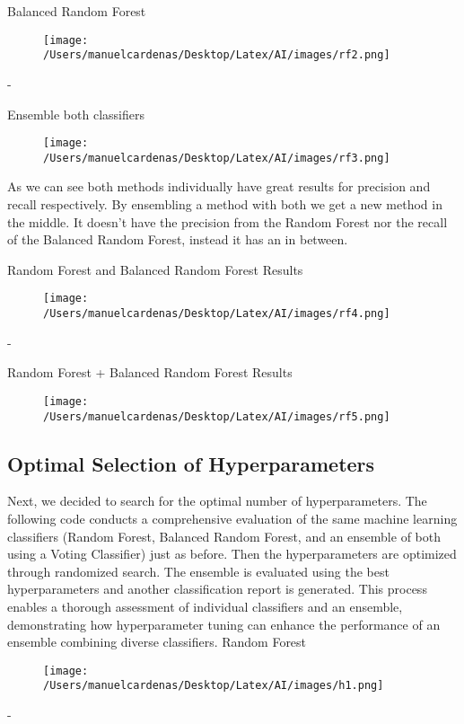 \documentclass{article}
\begin{document}
    Balanced Random Forest
    \begin{figure}[h]
        \centering
        \texttt{[image: /Users/manuelcardenas/Desktop/Latex/AI/images/rf2.png]}
        \label{fig:rf2}
    \end{figure}
    - \pagebreak

    Ensemble both classifiers
    \begin{figure}[h]
        \centering
        \texttt{[image: /Users/manuelcardenas/Desktop/Latex/AI/images/rf3.png]}
        \label{fig:rf3}
    \end{figure}
    
    As we can see both methods individually have great results for precision and recall respectively. 
    By ensembling a method with both we get a new method in the middle. It doesn't have the precision from the Random Forest nor the recall of the Balanced Random Forest, instead it has an in between.\pagebreak

    Random Forest and Balanced Random Forest Results
    \begin{figure}[h]
        \centering
        \texttt{[image: /Users/manuelcardenas/Desktop/Latex/AI/images/rf4.png]}
        \label{fig:rf4}
    \end{figure}
    - \pagebreak

    Random Forest + Balanced Random Forest Results
    \begin{figure}[h]
        \centering
        \texttt{[image: /Users/manuelcardenas/Desktop/Latex/AI/images/rf5.png]}
        \label{fig:rf5}
    \end{figure}

    \subsection{Optimal Selection of Hyperparameters}

    Next, we decided to search for the optimal number of hyperparameters. The following code conducts a comprehensive 
    evaluation of the same machine learning classifiers (Random Forest, Balanced Random Forest, and an ensemble of both using 
    a Voting Classifier) just as before. Then the hyperparameters are optimized through randomized search. The ensemble is evaluated 
    using the best hyperparameters and another classification report is generated. This process enables a thorough assessment 
    of individual classifiers and an ensemble, demonstrating how hyperparameter tuning can enhance the performance of an ensemble 
    combining diverse classifiers.\pagebreak
    Random Forest
    \begin{figure}[h]
        \centering
        \texttt{[image: /Users/manuelcardenas/Desktop/Latex/AI/images/h1.png]}
        \label{fig:h1}
    \end{figure}
    - \pagebreak
\end{document}
